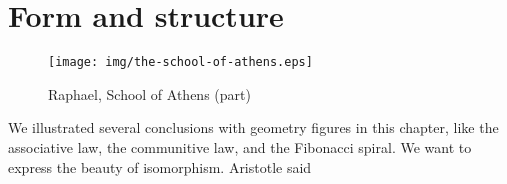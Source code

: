 \documentclass[UTF8]{article}
\begin{document}
\section{Form and structure}

\begin{figure}[htbp]
 \centering
 \texttt{[image: img/the-school-of-athens.eps]}
 \caption{Raphael, School of Athens (part)}
 \label{fig:the-school-of-athens}
\end{figure}

We illustrated several conclusions with geometry figures in this chapter, like the associative law, the communitive law, and the Fibonacci spiral. We want to express the beauty of isomorphism. Aristotle said
\end{document}

